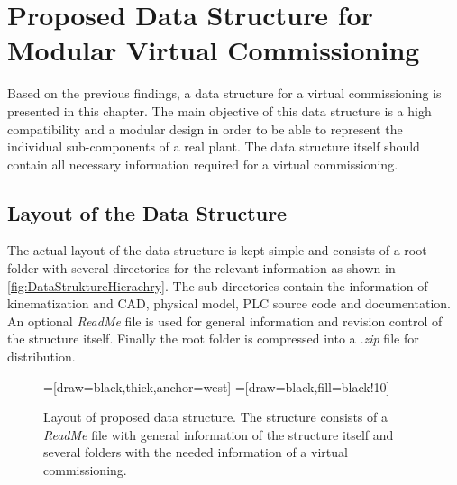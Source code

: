 \chapter{Proposed Data Structure for Modular Virtual Commissioning} \label{sec:DataStructure}
    Based on the previous findings, a data structure for a virtual commissioning is presented in this chapter. The main objective of this data structure is a high compatibility and a modular design in order to be able to represent the individual sub-components of a real plant. The data structure itself should contain all necessary information required for a virtual commissioning.
    
\section{Layout of the Data Structure}
    The actual layout of the data structure is kept simple and consists of a root folder with several directories for the relevant information as shown in \autoref{fig:DataStruktureHierachry}. The sub-directories contain the information of kinematization and CAD, physical model, PLC source code and documentation. An optional \textit{ReadMe} file is used for general information and revision control of the structure itself. Finally the root folder is compressed into a \textit{.zip} file for distribution. 
	\begin{figure}[htp]
		\centering
		\footnotesize
        =[draw=black,thick,anchor=west]
        =[draw=black,fill=black!10]
		\caption[Layout of proposed data structure.]{Layout of proposed data structure. The structure consists of a \textit{ReadMe} file with general information of the structure itself and several folders with the needed information of a virtual commissioning.}
		\label{fig:DataStruktureHierachry}
	\end{figure}

